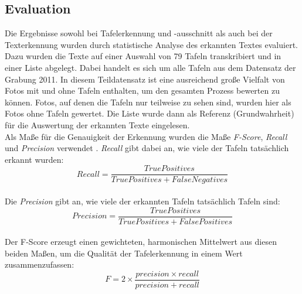 
\subsection{Evaluation}

Die Ergebnisse sowohl bei Tafelerkennung und -ausschnitt als auch bei der Texterkennung wurden durch statistische Analyse des erkannten Textes evaluiert. Dazu wurden die Texte auf einer Auswahl von 79 Tafeln transkribiert und in einer Liste abgelegt. Dabei handelt es sich um alle Tafeln aus dem Datensatz der Grabung 2011. In diesem Teildatensatz ist eine ausreichend große Vielfalt von Fotos mit und ohne Tafeln enthalten, um den gesamten Prozess bewerten zu können. Fotos, auf denen die Tafeln nur teilweise zu sehen sind, wurden hier als Fotos ohne Tafeln gewertet. Die Liste wurde dann als Referenz (Grundwahrheit) für die Auswertung der erkannten Texte eingelesen.\\
Als Maße für die Genauigkeit der Erkennung wurden die Maße \textit{F-Score},  \textit{Recall} und \textit{Precision} verwendet \cite{haraldklinke}{} \cite{qixiangye}. \textit{Recall} gibt dabei an, wie viele der Tafeln tatsächlich erkannt wurden:\\ \begin{equation}Recall = \frac{True Positives}{True Positives + False Negatives}\end{equation}\\Die \textit{Precision} gibt an, wie viele der erkannten Tafeln tatsächlich Tafeln sind:\\\begin{equation}Precision = \frac{True Positives}{True Positives + False Positives}\end{equation}\\Der F-Score erzeugt einen gewichteten, harmonischen Mittelwert aus diesen beiden Maßen, um die Qualität der Tafelerkennung in einem Wert zusammenzufassen:\\\begin{equation}F = 2 \times \frac{precision \times recall}{precision + recall}\end{equation}\\%
